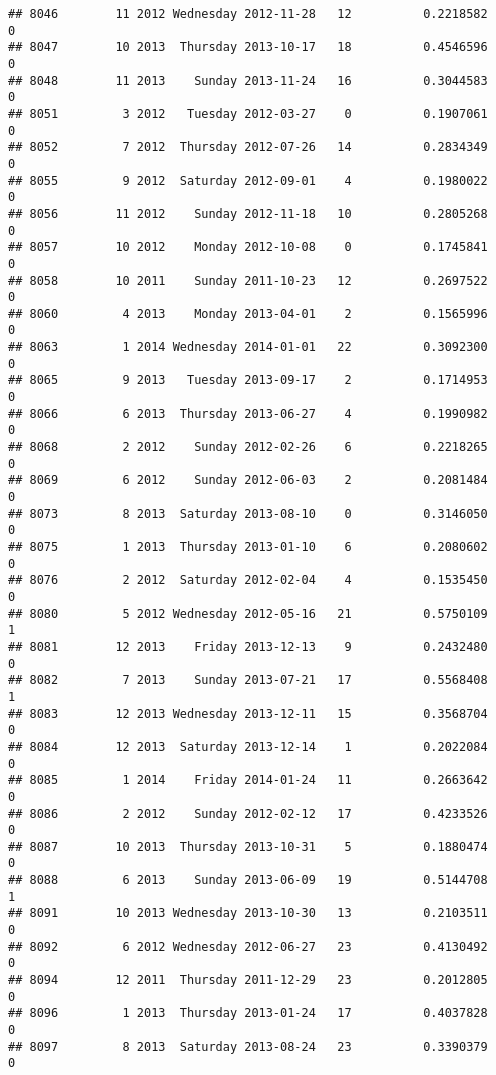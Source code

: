 \documentclass[
]{article}
\begin{document}
\begin{verbatim}
## 8046        11 2012 Wednesday 2012-11-28   12          0.2218582             0
## 8047        10 2013  Thursday 2013-10-17   18          0.4546596             0
## 8048        11 2013    Sunday 2013-11-24   16          0.3044583             0
## 8051         3 2012   Tuesday 2012-03-27    0          0.1907061             0
## 8052         7 2012  Thursday 2012-07-26   14          0.2834349             0
## 8055         9 2012  Saturday 2012-09-01    4          0.1980022             0
## 8056        11 2012    Sunday 2012-11-18   10          0.2805268             0
## 8057        10 2012    Monday 2012-10-08    0          0.1745841             0
## 8058        10 2011    Sunday 2011-10-23   12          0.2697522             0
## 8060         4 2013    Monday 2013-04-01    2          0.1565996             0
## 8063         1 2014 Wednesday 2014-01-01   22          0.3092300             0
## 8065         9 2013   Tuesday 2013-09-17    2          0.1714953             0
## 8066         6 2013  Thursday 2013-06-27    4          0.1990982             0
## 8068         2 2012    Sunday 2012-02-26    6          0.2218265             0
## 8069         6 2012    Sunday 2012-06-03    2          0.2081484             0
## 8073         8 2013  Saturday 2013-08-10    0          0.3146050             0
## 8075         1 2013  Thursday 2013-01-10    6          0.2080602             0
## 8076         2 2012  Saturday 2012-02-04    4          0.1535450             0
## 8080         5 2012 Wednesday 2012-05-16   21          0.5750109             1
## 8081        12 2013    Friday 2013-12-13    9          0.2432480             0
## 8082         7 2013    Sunday 2013-07-21   17          0.5568408             1
## 8083        12 2013 Wednesday 2013-12-11   15          0.3568704             0
## 8084        12 2013  Saturday 2013-12-14    1          0.2022084             0
## 8085         1 2014    Friday 2014-01-24   11          0.2663642             0
## 8086         2 2012    Sunday 2012-02-12   17          0.4233526             0
## 8087        10 2013  Thursday 2013-10-31    5          0.1880474             0
## 8088         6 2013    Sunday 2013-06-09   19          0.5144708             1
## 8091        10 2013 Wednesday 2013-10-30   13          0.2103511             0
## 8092         6 2012 Wednesday 2012-06-27   23          0.4130492             0
## 8094        12 2011  Thursday 2011-12-29   23          0.2012805             0
## 8096         1 2013  Thursday 2013-01-24   17          0.4037828             0
## 8097         8 2013  Saturday 2013-08-24   23          0.3390379             0

\end{verbatim}
\end{document}
